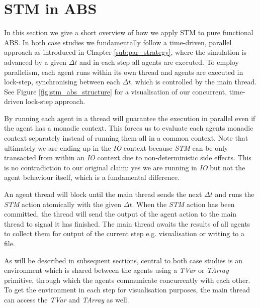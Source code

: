 \section{STM in ABS}
\label{sec:stm_abs}
In this section we give a short overview of how we apply STM to pure functional ABS. In both case studies we fundamentally follow a time-driven, parallel approach as introduced in Chapter \ref{sub:par_strategy}, where the simulation is advanced by a given $\Delta t$ and in each step all agents are executed. To employ parallelism, each agent runs within its own thread and agents are executed in lock-step, synchronising between each $\Delta t$, which is controlled by the main thread. See Figure \ref{fig:stm_abs_structure} for a visualisation of our concurrent, time-driven lock-step approach.

By running each agent in a thread will guarantee the execution in parallel even if the agent has a monadic context. This forces us to evaluate each agents monadic context separately instead of running them all in a common context. Note that ultimately we are ending up in the \textit{IO} context because \textit{STM} can be only transacted from within an \textit{IO} context due to non-deterministic side effects. This is no contradiction to our original claim: yes we are running in \textit{IO} but not the agent behaviour itself, which is a fundamental difference.

An agent thread will block until the main thread sends the next $\Delta t$ and runs the \textit{STM} action atomically with the given $\Delta t$. When the \textit{STM} action has been committed, the thread will send the output of the agent action to the main thread to signal it has finished. The main thread awaits the results of all agents to collect them for output of the current step e.g. visualisation or writing to a file.

As will be described in subsequent sections, central to both case studies is an environment which is shared between the agents using a \textit{TVar} or \textit{TArray} primitive, through which the agents communicate concurrently with each other. To get the environment in each step for visualisation purposes, the main thread can access the \textit{TVar} and \textit{TArray} as well. 

